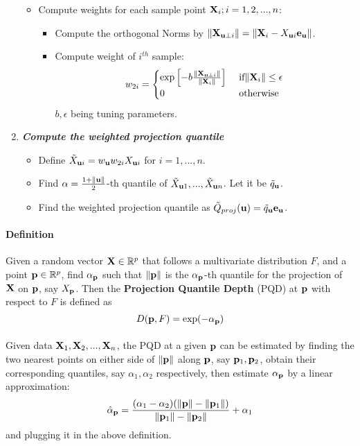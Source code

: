 \documentclass{article}
\begin{document}
\begin{enumerate}
\begin{itemize}
\item Compute weights for each sample point ${\mathbf{X}}_i; i=1,2,...,n$:

\begin{itemize}
\item Compute the orthogonal Norms by $\|{\mathbf{X}}_{{\bf{u}}\perp i}\|=\|{\mathbf{X}}_i-X_{{\bf{u}} i}{\bf{e}}_{\bf{u}}\|$.

\item Compute weight of $i^{th}$ sample:
$$w_{2i} = \begin{cases}
\exp\left[-b\frac{\|{\mathbf{X}}_{{\bf{u}}\perp i}\|}{\|{\mathbf{X}}_i\|}\right] & \mbox{ if}\|{\mathbf{X}}_i\|\leq\epsilon\\
0 & \mbox{ otherwise}
\end{cases} $$
$b,\epsilon$ being tuning parameters.
\end{itemize}
\end{itemize} 

\item \textit{\textbf{Compute the weighted projection quantile}}

\begin{itemize}

\item Define $\tilde X_{{\bf{u}} i} = w_{\bf{u}} w_{2i}X_{{\bf{u}} i}$ for $i=1,...,n$.

\item Find $\alpha=\frac{1+\|{\bf{u}}\|}{2}$-th quantile of $\tilde X_{{\bf{u}} 1},...,\tilde X_{{\bf{u}} n}$. Let it be $\tilde q_{\bf{u}}$.

\item Find the weighted projection quantile as $\tilde Q_{proj}({\bf{u}})=\tilde q_{\bf{u}}{\bf{e}}_{\bf{u}}$.

\end{itemize}

\end{enumerate}

\newpage

\paragraph{Definition} Given a random vector ${\mathbf{X}}\in \mathbb{R}^p$ that follows a multivariate distribution $F$, and a point ${\bf{p}}\in\mathbb{R}^p$, find $\alpha_{\bf{p}}$ such that $\|{\bf{p}}\|$ is the $\alpha_{\bf{p}}$-th quantile for the projection of ${\mathbf{X}}$ on ${\bf{p}}$, say $X_{\bf{p}}$. Then the \textbf{Projection Quantile Depth} (PQD) at ${\bf{p}}$ with respect to $F$ is defined as
$$ D({\bf{p}}, F) = \exp(-\alpha_{\bf{p}}) $$

\paragraph{} Given data ${\mathbf{X}}_1,{\mathbf{X}}_2,...,{\mathbf{X}}_n$, the PQD at a given ${\bf{p}}$ can be estimated by finding the two nearest points on either side of $\|{\bf{p}}\|$ along ${\bf{p}}$, say ${\bf{p}}_1, {\bf{p}}_2$, obtain their corresponding quantiles, say $\alpha_1, \alpha_2$ respectively, then estimate $\alpha_{\bf{p}}$ by a linear approximation:
$$\hat\alpha_{\bf{p}}=\frac{(\alpha_1-\alpha_2)(\|{\bf{p}}\|-\|{\bf{p}}_1\|)}{\|{\bf{p}}_1\|-\|{\bf{p}}_2\|}+\alpha_1$$
and plugging it in the above definition.
\end{document}
